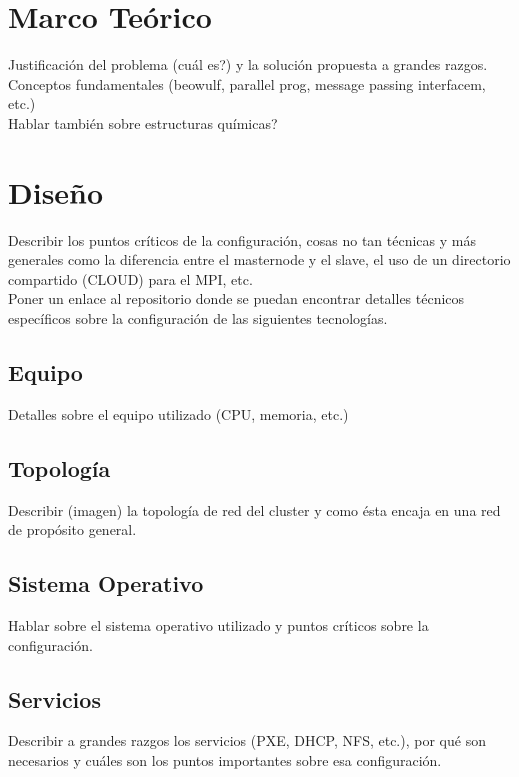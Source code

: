 \documentclass[journal]{IEEEtran}
\begin{document}
\section{Marco Teórico}

Justificación del problema (cuál es?) y la solución propuesta a grandes razgos.
\\
Conceptos fundamentales (beowulf, parallel prog, message passing interfacem, etc.)
\\
Hablar también sobre estructuras químicas?

\section{Diseño}

Describir los puntos críticos de la configuración, cosas no tan técnicas y más generales como la diferencia entre el masternode y el slave, el uso de un directorio compartido (CLOUD) para el MPI, etc.
\\
Poner un enlace al repositorio donde se puedan encontrar detalles técnicos específicos sobre la configuración de las siguientes tecnologías.

\subsection{Equipo}

Detalles sobre el equipo utilizado (CPU, memoria, etc.)

\subsection{Topología}

Describir (imagen) la topología de red del cluster y como ésta encaja en una red de propósito general.

\subsection{Sistema Operativo}

Hablar sobre el sistema operativo utilizado y puntos críticos sobre la configuración.

\subsection{Servicios}

Describir a grandes razgos los servicios (PXE, DHCP, NFS, etc.), por qué son necesarios y cuáles son los puntos importantes sobre esa configuración.
\end{document}
